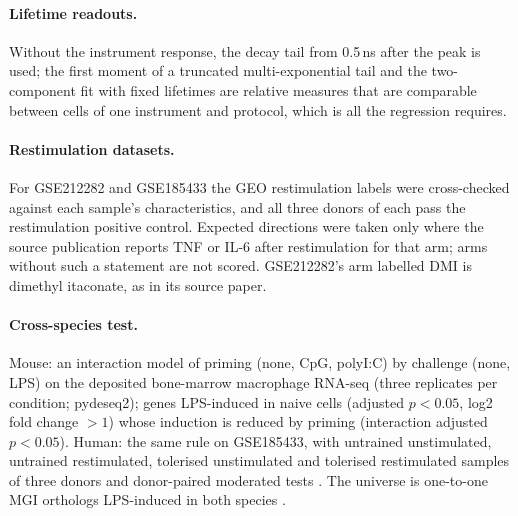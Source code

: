 \paragraph{Lifetime readouts.} Without the instrument response, the decay tail from 0.5\,ns
after the peak is used; the first moment of a truncated multi-exponential tail and the
two-component fit with fixed lifetimes are relative measures that are comparable between
cells of one instrument and protocol, which is all the regression requires.

\paragraph{Restimulation datasets.} For GSE212282 and GSE185433 the GEO restimulation
labels were cross-checked against each sample's characteristics, and all three donors of
each pass the restimulation positive control. Expected directions were taken only where
the source publication reports TNF or IL-6 after restimulation for that arm; arms without
such a statement are not scored. GSE212282's arm labelled DMI is dimethyl itaconate, as in
its source paper.

\paragraph{Cross-species test.} Mouse: an interaction model of priming (none, CpG,
polyI:C) by challenge (none, LPS) on the deposited bone-marrow macrophage RNA-seq (three
replicates per condition; pydeseq2); genes LPS-induced in naive cells (adjusted $p<0.05$,
log2 fold change $>1$) whose induction is reduced by priming (interaction adjusted
$p<0.05$). Human: the same rule on GSE185433, with untrained unstimulated, untrained
restimulated, tolerised unstimulated and tolerised restimulated samples of three donors
and donor-paired moderated tests \citep{smyth2004}. The universe is one-to-one MGI orthologs
LPS-induced in both species \citep{mgi}.
